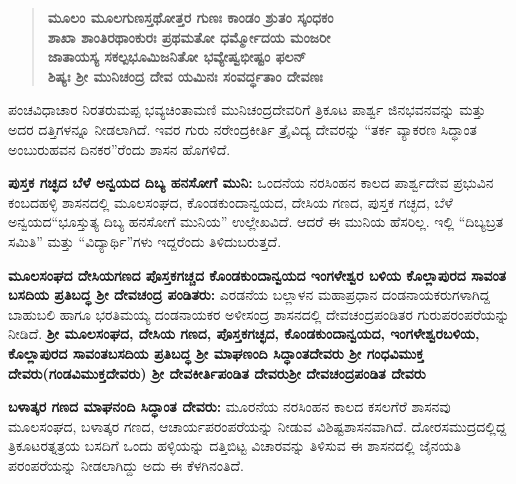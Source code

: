 \begin{verse}
\textbf{ಮೂಲಂ ಮೂಲಗುಣಸ್ತಥೋತ್ತರ ಗುಣಃ ಕಾಂಡಂ ಶ್ರುತಂ ಸ್ಕಂಧಕಂ} \\\textbf{ಶಾಖಾ ಶಾಂತಿರಥಾಂಕುರಃ ಪ್ರಥಮತೋ ಧರ್ಮ್ಮೋದಯ ಮಂಜರೀ} \\\textbf{ಜಾತಾಯಸ್ಯ ಸಕಲ್ಪಭೂಮಿಜನಿತೋ ಭವ್ಯೇಷ್ವಭೀಷ್ಟಂ ಫಲನ್​} \\\textbf{ಶಿಷ್ಯಃ ಶ‍್ರೀ ಮುನಿಚಂದ್ರ ದೇವ ಯಮಿನಃ ಸಂವರ್ದ್ಧತಾಂ ದೇವಣಃ}
\end{verse}

\vskip 3pt

ಪಂಚವಿಧಾಚಾರ ನಿರತರುಮಪ್ಪ ಭವ್ಯಚಿಂತಾಮಣಿ ಮುನಿಚಂದ್ರದೇವರಿಗೆ ತ್ರಿಕೂಟ ಪಾರ್ಶ್ವ ಜಿನಭವನವನ್ನು ಮತ್ತು ಅದರ ದತ್ತಿಗಳನ್ನೂ ನೀಡಲಾಗಿದೆ. ಇವರ ಗುರು ನರೇಂದ್ರಕೀರ್ತಿ ತ್ರೈವಿದ್ಯ ದೇವರನ್ನು “ತರ್ಕ ವ್ಯಾಕರಣ ಸಿದ್ಧಾಂತ ಅಂಬುರುಹವನ ದಿನಕರ”ರೆಂದು ಶಾಸನ ಹೊಗಳಿದೆ.

\vskip 3pt

\textbf{ಪುಸ್ತಕ ಗಚ್ಛದ ಬೆಳೆ ಅನ್ವಯದ ದಿಬ್ಯ ಹನಸೋಗೆ ಮುನಿ:} ಒಂದನೆಯ ನರಸಿಂಹನ ಕಾಲದ ಪಾರ್ಶ್ವದೇವ ಪ್ರಭು\-ವಿನ ಕಂಬದಹಳ್ಳಿ ಶಾಸನದಲ್ಲಿ ಮೂಲಸಂಘದ, ಕೊಂಡಕುಂದಾನ್ವಯದ, ದೇಸಿಯ ಗಣದ, ಪುಸ್ತಕ ಗಚ್ಛದ, ಬೆಳೆ ಅನ್ವಯದ\break “ಭೂಸ್ತುತ್ಯ ದಿಬ್ಯ ಹನಸೋಗೆ ಮುನಿಯ” ಉಲ್ಲೇಖವಿದೆ. ಆದರೆ ಈ ಮುನಿಯ ಹೆಸರಿಲ್ಲ. ಇಲ್ಲಿ “ದಿಬ್ಯಬ್ರತ ಸಮಿತಿ” ಮತ್ತು “ವಿದ್ಯಾರ್ಥಿ”ಗಳು ಇದ್ದರೆಂದು ತಿಳಿದುಬರುತ್ತದೆ.

\vskip 3pt

\textbf{ಮೂಲಸಂಘದ ದೇಸಿಯಗಣದ ಪೊಸ್ತಕಗಚ್ಚದ ಕೊಂಡಕುಂದಾನ್ವಯದ ಇಂಗಳೇಶ್ವರ ಬಳಿಯ ಕೊಲ್ಲಾಪುರದ ಸಾವಂತ ಬಸದಿಯ ಪ್ರತಿಬದ್ಧ ಶ‍್ರೀ ದೇವಚಂದ್ರ ಪಂಡಿತರು: } ಎರಡನೆಯ ಬಲ್ಲಾಳನ ಮಹಾಪ್ರಧಾನ ದಂಡನಾಯಕರುಗಳಾಗಿದ್ದ ಬಾಹುಬಲಿ ಹಾಗೂ ಭರತಿಮಯ್ಯ ದಂಡನಾಯಕರ ಅಳೀಸಂದ್ರ ಶಾಸನದಲ್ಲಿ ದೇವಚಂದ್ರಪಂಡಿತರ ಗುರುಪರಂಪರೆಯನ್ನು ನೀಡಿದೆ. \textbf{ಶ‍್ರೀ ಮೂಲಸಂಘದ, ದೇಸಿಯ ಗಣದ, ಪೊಸ್ತಕಗಚ್ಛದ, ಕೊಂಡಕುಂದಾನ್ವಯದ, ಇಂಗಳೇಶ್ವರಬಳಿಯ, ಕೊಲ್ಲಾಪುರದ ಸಾವಂತಬಸದಿಯ ಪ್ರತಿಬದ್ಧ ಶ‍್ರೀ ಮಾಘಣಂದಿ ಸಿದ್ಧಾಂತದೇವರು \general{\enginline{-}} ಶ‍್ರೀ ಗಂಧವಿಮುಕ್ತ ದೇವರು\general{\break }(ಗಂಡವಿಮುಕ್ತದೇವರು) \general{\enginline{-}} ಶ‍್ರೀ ದೇವಕೀರ್ತಿಪಂಡಿತ ದೇವರು\general{\enginline{-}}ಶ‍್ರೀ ದೇವಚಂದ್ರಪಂಡಿತ ದೇವರು}

\vskip 3pt

\textbf{ಬಳಾತ್ಕರ ಗಣದ ಮಾಘನಂದಿ ಸಿದ್ಧಾಂತ ದೇವರು:} ಮೂರನೆಯ ನರಸಿಂಹನ ಕಾಲದ ಕಸಲಗೆರೆ ಶಾಸನವು ಮೂಲಸಂಘದ, ಬಳಾತ್ಕರ ಗಣದ, ಆಚಾರ್ಯಪರಂಪರೆಯನ್ನು ನೀಡುವ ವಿಶಿಷ್ಟಶಾಸನವಾಗಿದೆ. ದೋರಸಮುದ್ರದಲ್ಲಿದ್ದ ತ್ರಿಕೂಟರತ್ನತ್ರಯ ಬಸದಿಗೆ ಒಂದು ಹಳ್ಳಿಯನ್ನು ದತ್ತಿಬಿಟ್ಟ ವಿಚಾರವನ್ನು ತಿಳಿಸುವ ಈ ಶಾಸನದಲ್ಲಿ ಜೈನಯತಿ ಪರಂಪರೆಯನ್ನು ನೀಡಲಾಗಿದ್ದು ಅದು ಈ ಕೆಳಗಿನಂತಿದೆ.

